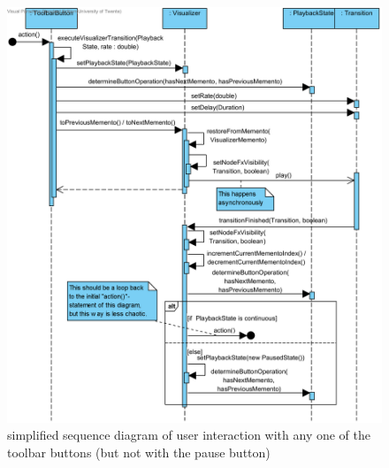 \begin{figure}[ht]
  \centering
  \includegraphics[width=1.1\textwidth]{diagrams/SD_server_userinteraction}
  \caption{simplified sequence diagram of user interaction with any one of the toolbar buttons (but not with the pause button)}\label{fig:sd_server_userinteraction}
\end{figure}